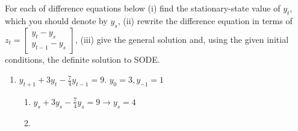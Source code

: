\documentclass[11pt]{article} %
\begin{document}
For each of difference equations below (i) find the stationary-state value of $y_t$, which you should denote by $y_s$, (ii) rewrite the difference equation in terms of $z_t=
    \begin{bmatrix} 
        y_t-y_s\\y_{t-1}-y_s
    \end{bmatrix}$, (iii) give the general solution and, using the given initial conditions, the definite solution to SODE.
\begin{enumerate}
    \item $y_{t+1}+3y_t-\frac{7}{4}y_{t-1}=9$. $y_0=3, y_{-1}=1$
    \begin{enumerate}
        \item $y_s+3y_s-\frac{7}{4}y_s=9 \longrightarrow y_s=4$
        \item 
    \end{enumerate}
\end{enumerate}
\end{document}
